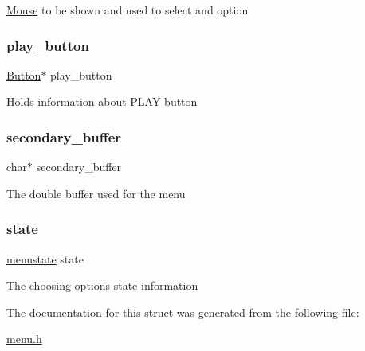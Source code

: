 \hyperlink{struct_mouse}{Mouse} to be shown and used to select and option \hypertarget{struct_menu_a17eeafa4c78aca8816c6aee85ce3a836}{}\label{struct_menu_a17eeafa4c78aca8816c6aee85ce3a836} 
\subsubsection{\texorpdfstring{play\+\_\+button}{play\_button}}
{\footnotesize\ttfamily \hyperlink{struct_button}{Button}$\ast$ play\+\_\+button}

Holds information about P\+L\+AY button \hypertarget{struct_menu_a1820f1e9a26c0253b13be1df94052ca1}{}\label{struct_menu_a1820f1e9a26c0253b13be1df94052ca1} 
\subsubsection{\texorpdfstring{secondary\+\_\+buffer}{secondary\_buffer}}
{\footnotesize\ttfamily char$\ast$ secondary\+\_\+buffer}

The double buffer used for the menu \hypertarget{struct_menu_aa42946365311ec5aa5a3ab71b9c52968}{}\label{struct_menu_aa42946365311ec5aa5a3ab71b9c52968} 
\subsubsection{\texorpdfstring{state}{state}}
{\footnotesize\ttfamily \hyperlink{group__menu_ga187fcd377cc0b403aaec48d4cfdc559a}{menustate} state}

The choosing options\textquotesingle{} state information 

The documentation for this struct was generated from the following file\+:\begin{DoxyCompactItemize}
\item 
\hyperlink{menu_8h}{menu.\+h}\end{DoxyCompactItemize}
